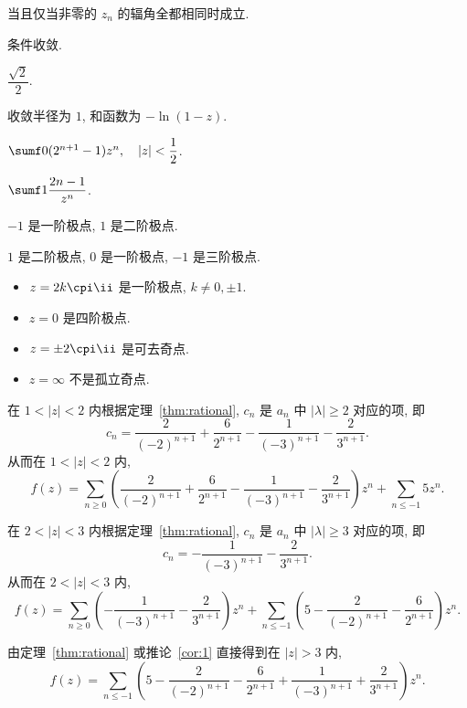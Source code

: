 \begin{multicols}{2}
\begin{exerciseanswer}
  \item 当且仅当非零的 $z_n$ 的辐角全都相同时成立.
  \item 条件收敛.
  \item $\dfrac{\sqrt2}2$.
  \item 收敛半径为 $1$, 和函数为 $-\ln(1-z)$.
  \item $\sumf0(2^{n+1}-1)z^n,\quad |z|<\dfrac12$.
  \item $\sumf1 \dfrac{2n-1}{z^n}$.
  \item $-1$ 是一阶极点, $1$ 是二阶极点.
  \item $1$ 是二阶极点, $0$ 是一阶极点, $-1$ 是三阶极点.
  \item \begin{itemize}
    \item $z=2k\cpi\ii $ 是一阶极点, $k\neq 0,\pm1$.
    \item $z=0$ 是四阶极点.
    \item $z=\pm 2\cpi\ii $ 是可去奇点.
    \item $z=\infty$ 不是孤立奇点.
  \end{itemize}
\end{exerciseanswer}




\begin{solution}
  \begin{enuma}
    \item 在 $1<|z|<2$ 内根据定理~\ref{thm:rational}, $c_n$ 是 $a_n$ 中 $|\lambda|\ge 2$ 对应的项, 即
  \[c_n=\frac2{(-2)^{n+1}}+\frac6{2^{n+1}}-\frac1{(-3)^{n+1}}-\frac2{3^{n+1}}.\]
  从而在 $1<|z|<2$ 内, 
  \[f(z)=\sum_{n\ge 0}\left(\frac2{(-2)^{n+1}}+\frac6{2^{n+1}}-\frac1{(-3)^{n+1}}-\frac2{3^{n+1}}\right)z^n+\sum_{n\le-1}5z^n.\]
      \item 在 $2<|z|<3$ 内根据定理~\ref{thm:rational}, $c_n$ 是 $a_n$ 中 $|\lambda|\ge 3$ 对应的项, 即
  \[c_n=-\frac1{(-3)^{n+1}}-\frac2{3^{n+1}}.\]
  从而在 $2<|z|<3$ 内, 
  \[f(z)=\sum_{n\ge 0}\left(-\frac1{(-3)^{n+1}}-\frac2{3^{n+1}}\right)z^n+\sum_{n\le-1}\left(5-\frac2{(-2)^{n+1}}-\frac6{2^{n+1}}\right)z^n.\]
    \item 由定理~\ref{thm:rational} 或推论~\ref{cor:1} 直接得到在 $|z|>3$ 内, 
  \[f(z)=\sum_{n\le-1}\left(5-\frac2{(-2)^{n+1}}-\frac6{2^{n+1}}+\frac1{(-3)^{n+1}}+\frac2{3^{n+1}}\right)z^n.\]    
  \end{enuma}
\end{solution}
  
\end{multicols}